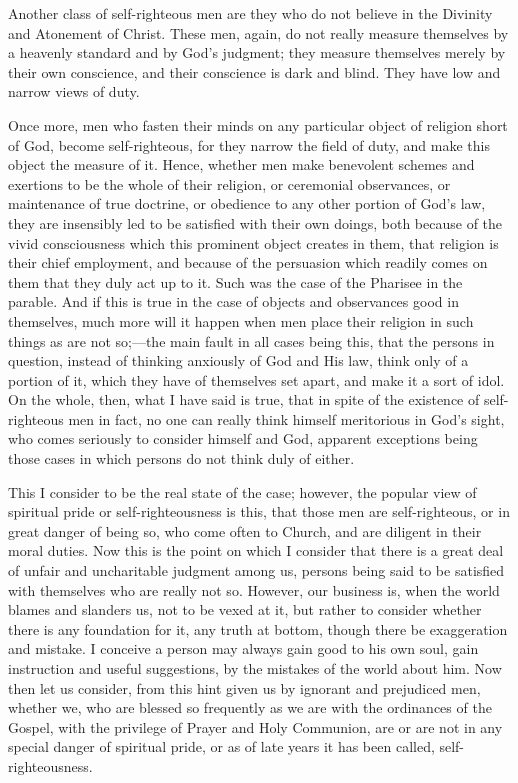 Another class of self-righteous men are they who do not believe in
the Divinity and Atonement of Christ. These men, again, do not really
measure themselves by a heavenly standard and by God's judgment; they
measure themselves merely by their own conscience, and their
conscience is dark and blind. They have low and narrow views of duty.

Once more, men who fasten their minds on any particular object of
religion short of God, become self-righteous, for they narrow the
field of duty, and make this object the measure of it. Hence, whether
men make benevolent schemes and exertions to be the whole of their
religion, or ceremonial observances, or maintenance of true doctrine,
or obedience to any other portion of God's law, they are insensibly
led to be satisfied with their own doings, both because of the vivid
consciousness which this prominent object creates in them, that
religion is their chief employment, and because of the persuasion
which readily comes on them that they duly act up to it. Such was the
case of the Pharisee in the parable. And if this is true in the case
of objects and observances good in themselves, much more will it
happen when men place their religion in such things as are not so;—the
main fault in all cases being this, that the persons in question,
instead of thinking anxiously of God and His law, think only of a
portion of it, which they have of themselves set apart, and make it a
sort of idol. On the whole, then, what I have said is true, that in
spite of the existence of self-righteous men in fact, no one can
really think himself meritorious in God's sight, who comes seriously
to consider himself and God, apparent exceptions being those cases in
which persons do not think duly of either.

This I consider to be the real state of the case; however, the
popular view of spiritual pride or self-righteousness is this, that
those men are self-righteous, or in great danger of being so, who come
often to Church, and are diligent in their moral duties. Now this is
the point on which I consider that there is a great deal of unfair and
uncharitable judgment among us, persons being said to be satisfied
with themselves who are really not so. However, our business is, when
the world blames and slanders us, not to be vexed at it, but rather to
consider whether there is any foundation for it, any truth at bottom,
though there be exaggeration and mistake. I conceive a person may
always gain good to his own soul, gain instruction and useful
suggestions, by the mistakes of the world about him. Now then let us
consider, from this hint given us by ignorant and prejudiced men,
whether we, who are blessed so frequently as we are with the
ordinances of the Gospel, with the privilege of Prayer and Holy
Communion, are or are not in any special danger of spiritual pride, or
as of late years it has been called, self-righteousness.

